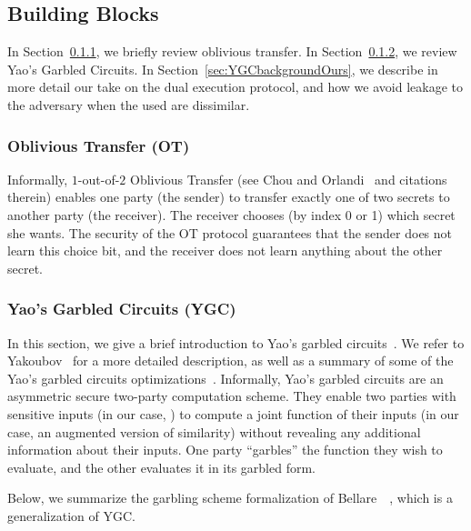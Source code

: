 



\subsection{Building Blocks}
\label{sec:YGCbackground}

In Section~\ref{sec:YGCbackgroundOT}, we briefly review oblivious transfer.
In Section~\ref{sec:YGCbackgroundYGC}, we review Yao's Garbled Circuits.
In Section~\ref{sec:YGCbackgroundOurs}, we describe in more detail our take on the dual execution protocol, and how we avoid leakage to the adversary when the \passwords used are dissimilar.

\subsubsection{Oblivious Transfer (OT)}
\label{sec:YGCbackgroundOT}

Informally, $1$-out-of-$2$ Oblivious Transfer (see Chou and Orlandi~\cite{LC:ChoOrl15} and citations therein) enables one party (the sender) to transfer exactly one of two secrets to another party (the receiver). 
The receiver chooses (by index 0 or 1) which secret she wants. 
The security of the OT protocol guarantees that the sender does not learn this choice bit, and 
the receiver does not learn anything about the other secret.

\subsubsection{Yao's Garbled Circuits (YGC)}
\label{sec:YGCbackgroundYGC}

In this section, we give a brief introduction to Yao's garbled circuits~\cite{FOCS:Yao86}.
We refer to Yakoubov~\cite{YGCintro} for a more detailed description, as well as a summary of some of the Yao's garbled circuits optimizations~\cite{STOC:BeaMicRog90,ICALP:KolSch08,AC:PSSW09,C:KolMohRos14,EC:ZahRosEva15,CCS:BalMalRos16}.
Informally, Yao's garbled circuits are an asymmetric secure two-party computation scheme.
They enable two parties with sensitive inputs (in our case, \passwords) to compute a joint function of their inputs (in our case, an augmented version of similarity) without revealing any additional information about their inputs.
One party ``garbles'' the function they wish to evaluate, and the other evaluates it in its garbled form.

Below, we summarize the garbling scheme formalization of Bellare~\etal~\cite{CCS:BelHoaRog12}, which is a generalization of YGC.

